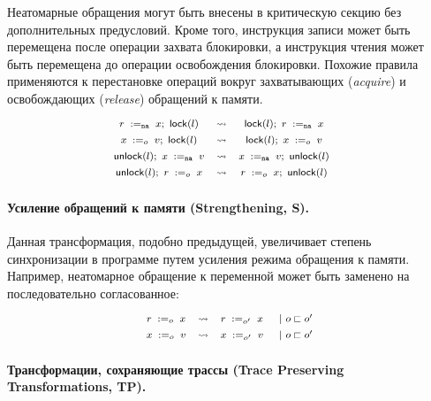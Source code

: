 Неатомарные обращения могут быть внесены 
в критическую секцию без дополнительных предусловий. 
Кроме того, инструкция записи может быть перемещена после 
операции захвата блокировки, а инструкция чтения 
может быть перемещена до операции освобождения блокировки. 
Похожие правила применяются к перестановке операций вокруг 
захватывающих (\emph{acquire}) и освобождающих (\emph{release}) 
обращений к памяти. 
\[\def\arraystretch{1.4}\footnotesize
  \begin{array}{cccl} 

      \readInst{\na}{r}{x} \seq \lockInst{l} 
    & \leadsto 
    & \lockInst{l} \seq \readInst{\na}{r}{x}
    & ~ \\ 

      \writeInst{o}{x}{v} \seq \lockInst{l} 
    & \leadsto 
    & \lockInst{l} \seq \writeInst{o}{x}{v}
    & ~  \\ 

      \unlockInst{l} \seq \writeInst{\na}{x}{v} 
    & \leadsto 
    & \writeInst{\na}{x}{v} \seq \unlockInst{l}
    & ~ \\ 


      \unlockInst{l} \seq \readInst{o}{r}{x} 
    & \leadsto 
    & \readInst{o}{r}{x} \seq \unlockInst{l}
    & ~  \\ 

  \end{array}
\]


\paragraph{
Усиление обращений к памяти
(Strengthening, S).
}

Данная трансформация, подобно предыдущей, 
увеличивает степень синхронизации в программе 
путем усиления режима обращения к памяти.
Например, неатомарное обращение к переменной  может быть заменено на 
последовательно согласованное: 
%
\[\def\arraystretch{1.4}\footnotesize
  \begin{array}{cccl} 

      \readInst{o}{r}{x} 
    & \leadsto 
    & \readInst{o'}{r}{x}
    & ~|~ o \sqsubset o' \\ 

      \writeInst{o}{x}{v}
    & \leadsto 
    & \writeInst{o'}{x}{v}
    & ~|~ o \sqsubset o'  \\ 

  \end{array}
\]

\paragraph{
Трансформации, сохраняющие трассы
(Trace Preserving Transformations, TP).
}

